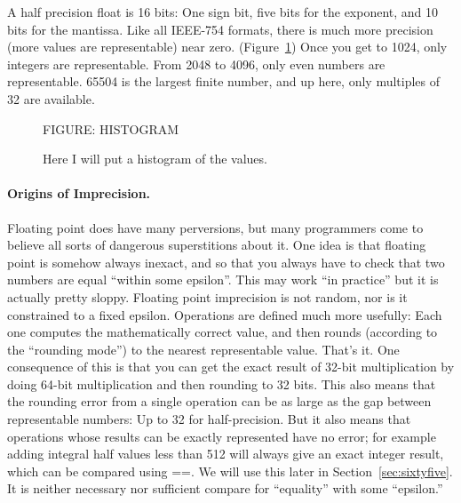 \documentclass[twocolumn]{article}
\begin{document}
A half precision float is 16 bits: One sign bit, five bits for the
exponent, and 10 bits for the mantissa. Like all IEEE-754 formats,
there is much more precision (more values are representable) near
zero. (Figure~\ref{fig:histogram}) Once you get to 1024,
only integers are representable. From 2048 to 4096, only even numbers
are representable. 65504 is the largest finite number, and up here,
only multiples of 32 are available.

\begin{figure}
FIGURE: HISTOGRAM
\caption{
Here I will put a histogram of the values.
  } \label{fig:histogram}
\end{figure}

\paragraph{Origins of Imprecision.}
Floating point does have many perversions, but many programmers come
to believe all sorts of dangerous superstitions about it. One idea is
that floating point is somehow always inexact, and so that you always
have to check that two numbers are equal ``within some
epsilon''\cite{murphy2014epsilon}. This may work ``in practice'' but
it is actually pretty sloppy. Floating point imprecision is not
random, nor is it constrained to a fixed epsilon. Operations are
defined much more usefully: Each one computes the mathematically
correct value, and then rounds (according to the ``rounding mode'') to
the nearest representable value. That's it. One consequence of this is
that you can get the exact result of 32-bit multiplication by doing
64-bit multiplication and then rounding to 32 bits. This also means
that the rounding error from a single operation can be as large as the
gap between representable numbers: Up to 32 for half-precision. But it
also means that operations whose results can be exactly represented
have no error; for example adding integral half values less than 512
will always give an exact integer result, which can be compared using
==. We will use this later in Section~\ref{sec:sixtyfive}. It is
neither necessary nor sufficient compare for ``equality'' with some
``epsilon.''
\end{document}
